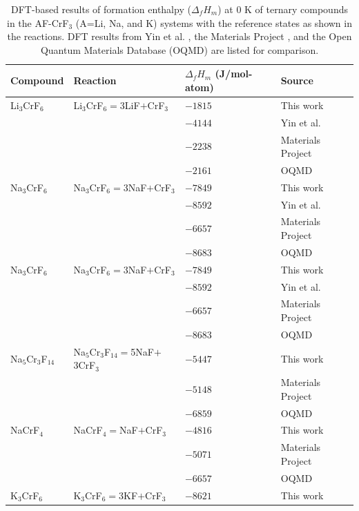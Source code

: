 \begin{table}[H]
    \centering
    \caption{DFT-based results of formation enthalpy ($\Delta_fH_m$) at 0 K of ternary compounds in the AF-CrF$_3$ (A=Li, Na, and K) systems with the reference states as shown in the reactions. DFT results from Yin et al. \cite{yin2018thermodynamic, yin2014thermodynamic}, the Materials Project \cite{jain2013commentary}, and the Open Quantum Materials Database (OQMD) \cite{kirklin2015open} are listed for comparison.}
    \begin{tabular}{>{\raggedright\arraybackslash}m{2.5cm}>{\raggedright\arraybackslash}m{5cm}>{\raggedright\arraybackslash}m{3cm}>{\raggedright\arraybackslash}m{5cm}}
    \hline
    \textbf{Compound}&\textbf{Reaction}&\textbf{$\Delta_fH_m$ (J/mol-atom)}&\textbf{Source}\\
    \hline
    Li$_3$CrF$_6$&Li$_3$CrF$_6$$=$3LiF$+$CrF$_3$&$-1815$&This work\\
    &&$-4144$&Yin et al. \cite{yin2014thermodynamic}\\
    &&$-2238$&Materials Project \cite{jain2013commentary}\\
    &&$-2161$&OQMD \cite{kirklin2015open}\\
    Na$_3$CrF$_6$&Na$_3$CrF$_6$$=$3NaF$+$CrF$_3$&$-7849$&This work\\
	&&$-8592$&Yin et al. \cite{yin2018thermodynamic}\\
    &&$-6657$&Materials Project \cite{jain2013commentary}\\
    &&$-8683$&OQMD \cite{kirklin2015open}\\
    Na$_3$CrF$_6$&Na$_3$CrF$_6$$=$3NaF$+$CrF$_3$&$-7849$&This work\\
	&&$-8592$&Yin et al. \cite{yin2018thermodynamic}\\
    &&$-6657$&Materials Project  \cite{jain2013commentary}\\
    &&$-8683$&OQMD \cite{kirklin2015open}\\
    Na$_5$Cr$_3$F$_{14}$&Na$_5$Cr$_3$F$_{14}$$=$5NaF$+$3CrF$_3$&$-5447$&This work\\
	&&$-5148$&Materials Project \cite{jain2013commentary}\\
	&&$-6859$&OQMD \cite{kirklin2015open}\\
    NaCrF$_4$&NaCrF$_4$$=$NaF$+$CrF$_3$&$-4816$&This work\\
    &&$-5071$&Materials Project \cite{jain2013commentary}\\
	&&$-6657$&OQMD \cite{kirklin2015open}\\
    K$_3$CrF$_6$&K$_3$CrF$_6$$=$3KF$+$CrF$_3$&$-8621$&This work\\

\end{tabular}
\end{table}
